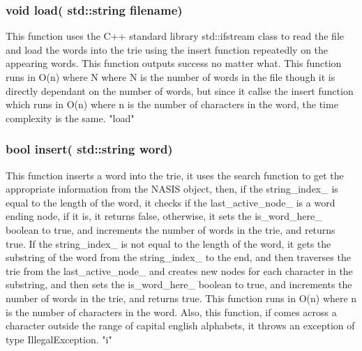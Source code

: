 \documentclass[a4paper]{article}
\begin{document}
\subsubsection{{\color{orange}void} {\color{draculapurple}load}({\color{orange} std::string} filename)}
This function uses the C++ standard library {\color{orange}std::ifstream} class to read the file and load the words into the trie using the {\color{draculapurple}insert} function repeatedly on the appearing words.
This function outputs {\color{green}success} no matter what. This function runs in {\color{lightblue}O(n)} where {\color{lightblue}N} where N is the number of words in the file 
though it is directly dependant on the number of words, but since it callse the {\color{draculapurple}insert} function which runs in {\color{lightblue}O(n)} where {\color{lightblue}n} 
is the number of characters in the word, the time complexity is the same.
{\color{GoldenYellow} "load"}

\subsubsection{{\color{orange}bool} {\color{draculapurple}insert}({\color{orange} std::string} word)}
This function inserts a word into the trie, it uses the {\color{draculapurple}search} function to get the appropriate information from the NASIS object, 
then, if the {\color{draculapurple}string\_index\_} is equal to the length of the word, it checks if the {\color{draculapurple}last\_active\_node\_} 
is a word ending node, if it is, it returns false, otherwise, it sets the {\color{draculapurple}is\_word\_here\_} boolean to true, and increments the 
number of words in the trie, and returns true. If the {\color{draculapurple}string\_index\_} is not equal to the length of the word, it gets the substring
 of the word from the {\color{draculapurple}string\_index\_} to the end, and then traverses the trie from the {\color{draculapurple}last\_active\_node\_} 
 and creates new nodes for each character in the substring, and then sets the {\color{draculapurple}is\_word\_here\_} boolean to true, and increments the
  number of words in the trie, and returns true. This function runs in {\color{lightblue}O(n)} where {\color{lightblue}n} is the number of characters in the word.
  Also, this function, if comes across a character outside the range of capital english alphabets, it throws an exception of type {\color{orange}IllegalException}.
  {\color{GoldenYellow} "i"}
\end{document}
